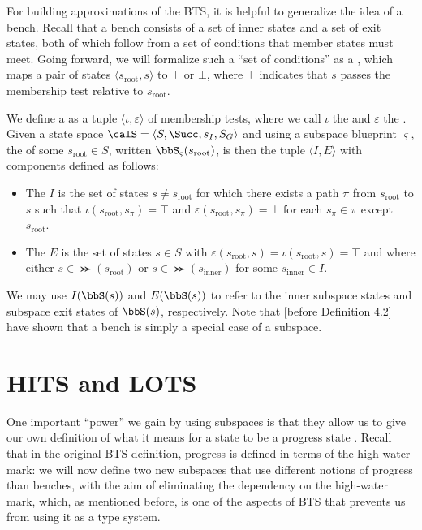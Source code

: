 For building approximations of the BTS, it is helpful to generalize the idea of a bench. Recall that a bench consists of a set of inner states and a set of exit states, both of which follow from a set of conditions that member states must meet. Going forward, we will formalize such a ``set of conditions'' as a , which maps a pair of states $\langle s_\text{root},s\rangle$ to $\top$ or $\bot$, where $\top$ indicates that $s$ passes the membership test relative to $s_\text{root}$.

We define a  as a tuple $\langle\iota,\varepsilon\rangle$ of membership tests, where we call $\iota$ the  and $\varepsilon$ the . Given a state space $\calS=\langle S,\Succ,s_I,S_G\rangle$ and using a subspace blueprint $\varsigma$, the  of some $s_\text{root}\in S$, written $\bbS_\varsigma(s_\text{root})$, is then the tuple $\langle I,E\rangle$ with components defined as follows:

\begin{itemize}
    \item The  $I$ is the set of states $s\neq s_\text{root}$ for which there exists a path $\pi$ from $s_\text{root}$ to $s$ such that $\iota(s_\text{root},s_\pi)=\top$ and $\varepsilon(s_\text{root},s_\pi)=\bot$ for each $s_\pi\in\pi$ except $s_\text{root}$.
    \item The  $E$ is the set of states $s\in S$ with $\varepsilon(s_\text{root},s)=\iota(s_\text{root},s)=\top$ and where either $s\in\Succ(s_\text{root})$ or $s\in\Succ(s_\text{inner})$ for some $s_\text{inner}\in I$.
\end{itemize}

We may use $I(\bbS(s))$ and $E(\bbS(s))$ to refer to the inner subspace states and subspace exit states of $\bbS(s)$, respectively. Note that  [before Definition 4.2] have shown that a bench is simply a special case of a subspace.

\section{HITS and LOTS}

One important ``power'' we gain by using subspaces is that they allow us to give our own definition of what it means for a state to be a progress state . Recall that in the original BTS definition, progress is defined in terms of the high-water mark: we will now define two new subspaces that use different notions of progress than benches, with the aim of eliminating the dependency on the high-water mark, which, as mentioned before, is one of the aspects of BTS that prevents us from using it as a type system.

